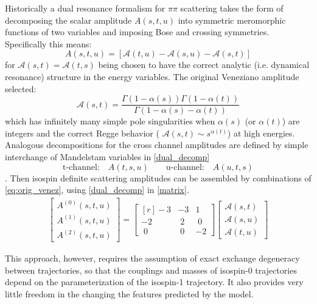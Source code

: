 \documentclass[aps,prd,amsmath,amssymb,superscriptaddress,onecolumn,
nofootinbib,showpacs,preprintnumbers]{revtex4-1}
\newcommand{\pp}{\pi\pi }
\newcommand{\ma}{\mathcal{A}}
\begin{document}
Historically a dual resonance formalism for $\pp$ scattering takes the form of decomposing the scalar amplitude $A(s,t,u)$ into symmetric meromorphic functions of two variables and imposing Bose and crossing symmetries. Specifically this means:
	\begin{equation}
		A(s,t,u) = [ \ma(t,u) - \ma(s,u) - \ma(s,t) ]
		\label{dual_decomp}
	\end{equation}
for $\ma(s,t) = \ma(t,s)$ being chosen to have the correct analytic (i.e. dynamical resonance) structure in the energy variables.
The original Veneziano amplitude selected:
	\begin{equation}
		\ma(s,t) = \frac{\Gamma( 1 - \alpha(s) ) \Gamma(1- \alpha(t))}{\Gamma(1- \alpha(s) - \alpha(t))}
		\label{eq:orig_venez}
	\end{equation}
which has infinitely many simple pole singularities when $\alpha(s)$ (or $\alpha(t)$) are integers and the correct Regge behavior ( $\ma(s,t) \sim s^{\alpha(t)}$) at high energies. Analogous decompositions for the cross channel amplitudes are defined by simple interchange of Mandelstam variables in \cref{dual_decomp}
	\begin{equation}
		\text{t-channel:} \quad A(t,s,u) \qquad \text{u-channel:} \quad A(u,t,s)
	\end{equation}.
Then isospin definite scattering amplitudes can be assembled by combinations of \cref{eq:orig_venez}, using \cref{dual_decomp} in \cref{matrix}.
\begin{align} \label{isoamps}
		\begin{bmatrix}
		A^{(0)}(s,t,u) \\ 
		A^{(1)}(s,t,u) \\ 
		A^{(2)}(s,t,u) 
		\end{bmatrix}
	= 
		\begin{bmatrix*}[r]
			-3 & -3 & 1 \\ 
			 -2 & \;2 & \;0 \\ 
				\; 0 & \; 0 & -2 
		\end{bmatrix*}
		\begin{bmatrix} 
		\ma(s,t) \\ 
		\ma(s,u) \\ 
		\ma(t,u)
		\end{bmatrix} 
	\end{align}
	
	 This approach, however, requires the assumption of exact exchange degeneracy between trajectories, so that the couplings and masses of isospin-0 trajectories depend on the parameterization of the isospin-1 trajectory. It also provides very little freedom in the changing the features predicted by the model.
\end{document}
